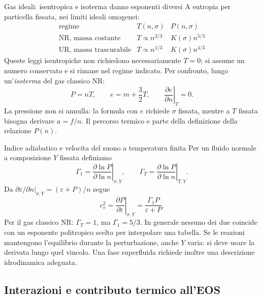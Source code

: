 \begin{frame}[t]{Gas ideali: isentropica e isoterma danno esponenti diversi}
\vspace*{3mm}
\small
A entropia per particella fissata, nei limiti ideali omogenei:
\[
\begin{array}{c|c|c}
\text{regime}&T(n,\sigma)&P(n,\sigma)\\\hline
\text{NR, massa costante}&T\propto n^{2/3}&K(\sigma)n^{5/3}\\
\text{UR, massa trascurabile}&T\propto n^{1/3}&K(\sigma)n^{4/3}
\end{array}
\]
Queste leggi isentropiche non richiedono necessariamente $T=0$;
si assume un numero conservato e si rimane nel regime indicato.
\smallskip
Per confronto, lungo un'\emph{isoterma} del gas classico NR:
\[
P=nT,\qquad e=m+\frac32T,\qquad
\left.\frac{\partial e}{\partial n}\right|_T=0.
\]
La pressione non si annulla: la formula con $e$ richiede $\sigma$ fissata,
mentre a $T$ fissata bisogna derivare $a=f/n$.
Il percorso termico e parte della definizione della relazione $P(n)$.
\end{frame}

\begin{frame}[t]{Indice adiabatico e velocita del suono a temperatura finita}
\vspace*{3mm}
\small
Per un fluido normale a composizione $Y$ fissata definiamo
\[
\Gamma_1=\left.\frac{\partial\ln P}{\partial\ln n}\right|_{\sigma,Y},
\qquad
\Gamma_T=\left.\frac{\partial\ln P}{\partial\ln n}\right|_{T,Y}.
\]
Da $\left.\partial\varepsilon/\partial n\right|_{\sigma,Y}
=(\varepsilon+P)/n$ segue
\[
\boxed{c_s^2=\left.\frac{\partial P}{\partial\varepsilon}\right|_{\sigma,Y}
=\frac{\Gamma_1 P}{\varepsilon+P}.}
\]
Per il gas classico NR: $\Gamma_T=1$, ma $\Gamma_1=5/3$.
In generale nessuno dei due coincide con un esponente politropico
scelto per interpolare una tabella.
\smallskip
Se le reazioni mantengono l'equilibrio durante la perturbazione,
anche $Y$ varia: si deve usare la derivata lungo quel vincolo.
Una fase superfluida richiede inoltre una descrizione idrodinamica adeguata.
\end{frame}

\subsection{Interazioni e contributo termico all'EOS}

